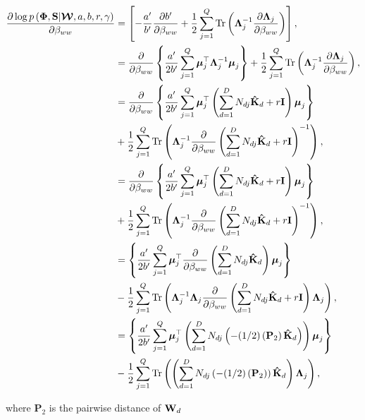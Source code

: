 	
	\begin{align}
	\frac{\partial \log p\left(\boldsymbol{\Phi},\mathbf{S}|\boldsymbol{\mathcal{W}},a,b,r,\gamma\right)}{\partial \beta_{ww}} &= \left[-\frac{a'}{b'}\frac{\partial b'}{\partial\beta_{ww}} + \frac{1}{2}\sum_{j=1}^{Q} \operatorname{Tr}\left(\boldsymbol{\Lambda}_j^{-1}\frac{\partial \boldsymbol{\Lambda}_j}{\partial \beta_{ww}}\right)\right], \\
	& =  \frac{\partial }{\partial \beta_{ww}}\left\{\frac{a'}{2b'}\sum\limits_{j=1}^{Q}\boldsymbol{\mu}_j^\top \boldsymbol{\Lambda}_j^{-1}\boldsymbol{\mu}_j\right\} +\frac{1}{2}\sum_{j=1}^{Q} \operatorname{Tr}\left(\boldsymbol{\Lambda}_j^{-1}\frac{\partial \boldsymbol{\Lambda}_j}{\partial \beta_{ww}}\right), \\
	& =  \frac{\partial }{\partial \beta_{ww}}\left\{\frac{a'}{2b'}\sum\limits_{j=1}^{Q}\boldsymbol{\mu}_j^\top \left(\sum\limits_{d=1}^{D}{N_{dj}\mathbf{\hat{K}}_d+r\mathbf{I}}\right)\boldsymbol{\mu}_j\right\} \\
	& +\frac{1}{2}\sum_{j=1}^{Q} \operatorname{Tr}\left(\boldsymbol{\Lambda}_j^{-1}\frac{\partial }{\partial \beta_{ww}}\left(\sum\limits_{d=1}^{D}{N_{dj}\mathbf{\hat{K}}_d+r\mathbf{I}}\right)^{-1}\right),\\
	& =  \frac{\partial }{\partial \beta_{ww}}\left\{\frac{a'}{2b'}\sum\limits_{j=1}^{Q}\boldsymbol{\mu}_j^\top \left(\sum\limits_{d=1}^{D}{N_{dj}\mathbf{\hat{K}}_d+r\mathbf{I}}\right)\boldsymbol{\mu}_j\right\} \\
	&+\frac{1}{2}\sum_{j=1}^{Q} \operatorname{Tr}\left(\boldsymbol{\Lambda}_j^{-1}\frac{\partial }{\partial \beta_{ww}}\left(\sum\limits_{d=1}^{D}{N_{dj}\mathbf{\hat{K}}_d+r\mathbf{I}}\right)^{-1}\right),\\
	& =  \left\{\frac{a'}{2b'}\sum\limits_{j=1}^{Q}\boldsymbol{\mu}_j^\top \frac{\partial }{\partial \beta_{ww}}\left(\sum\limits_{d=1}^{D}{N_{dj}\mathbf{\hat{K}}_d}\right)\boldsymbol{\mu}_j\right\} \\
	&-\frac{1}{2}\sum_{j=1}^{Q} \operatorname{Tr}\left(\boldsymbol{\Lambda}_j^{-1}\boldsymbol{\Lambda}_j \frac{\partial }{\partial \beta_{ww}}\left(\sum\limits_{d=1}^{D}{N_{dj}\mathbf{\hat{K}}_d+r\mathbf{I}}\right)\boldsymbol{\Lambda}_j\right),\\
	& =  \left\{\frac{a'}{2b'}\sum\limits_{j=1}^{Q}\boldsymbol{\mu}_j^\top \left(\sum\limits_{d=1}^{D}{N_{dj}\left(-(1/2)\left(\mathbf{P}_2\right)\mathbf{\hat{K}}_d\right)}\right)\boldsymbol{\mu}_j\right\} \\
	&-\frac{1}{2}\sum_{j=1}^{Q} \operatorname{Tr}\left( \left(\sum\limits_{d=1}^{D}{N_{dj}
		\left(-(1/2)\left(\mathbf{P}_2\right)\right)\mathbf{\hat{K}}_d}\right)\boldsymbol{\Lambda}_j\right),
	\end{align}
	
	where $\mathbf{P}_2$ is the pairwise distance of $\mathbf{W}_d$
	
	
